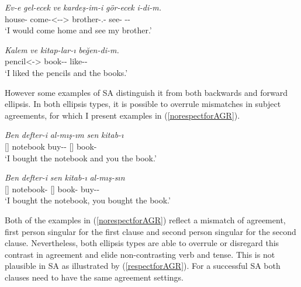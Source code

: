 \begin{exe}
    \ex \label{SAbackwards}
    \begin{xlist}
        \ex
        \gll 
        \textit{Ev-e} \textit{gel-ecek} \textit{ve} \textit{kardeş-im-i} \textit{gör-ecek} \textit{i-di-m.} \\ house-{\Dat} come-{\Fut}{\textless {\Cop}-{\Pst}-{\Fsg}\textgreater} {\And} brother-{\Poss}.{\Fsg}-{\Acc} see-{\Fut} {\Cop}-{\Pst}-{\Fsg} \\
        \glt `I would come home and see my brother.'
        
        \ex
        \gll
        \textit{Kalem} \textit{ve} \textit{kitap-lar-ı} \textit{beğen-di-m.} \\ pencil{\textless {\Pl}-{\Acc}\textgreater} {\And} book-{\Pl}-{\Acc} like-{\Pst}-{\Fsg} \\
        \glt `I liked the pencils and the books.'
    \end{xlist}
\end{exe}

However some examples of SA distinguish it from both backwards and forward ellipsis. In both ellipsis types, it is possible to overrule mismatches in subject agreements, for which I present examples in (\ref{norespectforAGR}).

\begin{exe}
    \ex \label{norespectforAGR}
    \begin{xlist}
        \ex 
        \gll 
        \textit{Ben} \textit{defter-i} \textit{al-mış-ım} \textit{sen} \textit{kitab-ı} \\ {\Fsg}[{\Nom}] notebook buy-{\Prf}-{\Fsg} {\Ssg}[{\Nom}] book-{\Acc} \\
        \glt `I bought the notebook and you the book.'
        
        \ex 
        \gll 
        \textit{Ben} \textit{defter-i} \textit{sen} \textit{kitab-ı} \textit{al-mış-sın} \\ {\Fsg}[{\Nom}] notebook-{\Acc} {\Ssg}[{\Nom}] book-{\Acc} buy-{\Prf}-{\Ssg} \\
        \glt `I bought the notebook, you bought the book.'
    \end{xlist}
\end{exe}

Both of the examples in (\ref{norespectforAGR}) reflect a mismatch of agreement, first person singular for the first clause and second person singular for the second clause. Nevertheless, both ellipsis types are able to overrule or disregard this contrast in agreement and elide non-contrasting verb and tense. This is not plausible in SA as illustrated by (\ref{respectforAGR}). For a successful SA both clauses need to have the same agreement settings.


